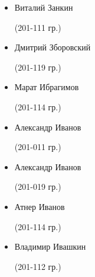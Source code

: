 \begin{multicols}{2}
\begin{small}
\begin{itemize}[leftmargin=0.5em]
	\item[] Виталий Занкин\begin{tiny} (201-111 гр.)\end{tiny} %
	\item[] Дмитрий Зборовский\begin{tiny} (201-119 гр.)\end{tiny}

	\item[] Марат Ибрагимов\begin{tiny} (201-114 гр.)\end{tiny}
	\item[] Александр Иванов\begin{tiny} (201-011 гр.)\end{tiny}
	\item[] Александр Иванов\begin{tiny} (201-019 гр.)\end{tiny}
	\item[] Атнер Иванов\begin{tiny} (201-114 гр.)\end{tiny}
	\item[] Владимир Ивашкин\begin{tiny} (201-112 гр.)\end{tiny}


\end{itemize}
\end{small}
\end{multicols}
